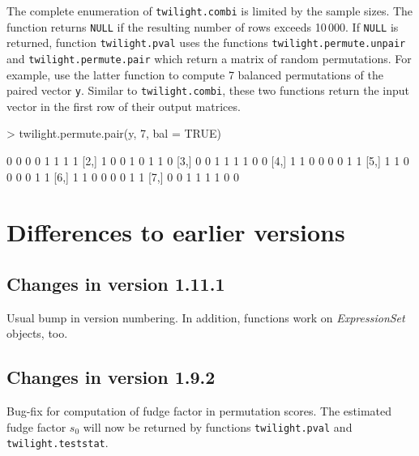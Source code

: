 \documentclass[11pt,a4paper,fleqn]{report}
\newcommand{\Rfunction}[1]{{\texttt{#1}}}
\newcommand{\Rclass}[1]{{\textit{#1}}}
\newcommand{\Rfunarg}[1]{{\texttt{#1}}}
\begin{document}
The complete enumeration of \Rfunction{twilight.combi} is limited by the sample sizes. The function returns \Rfunarg{NULL} if the resulting number of rows exceeds 10\,000. If \Rfunarg{NULL} is returned, function \Rfunction{twilight.pval} uses the functions \Rfunction{twilight.permute.unpair} and \Rfunction{twilight.permute.pair} which return a matrix of random permutations. For example, use the latter function to compute 7 balanced permutations of the paired vector \Rfunarg{y}. Similar to \Rfunction{twilight.combi}, these two functions return the input vector in the first row of their output matrices.
\begin{Schunk}
\begin{Sinput}
> twilight.permute.pair(y, 7, bal = TRUE)
\end{Sinput}
\begin{Soutput}
     [,1] [,2] [,3] [,4] [,5] [,6] [,7] [,8]
[1,]    0    0    0    0    1    1    1    1
[2,]    1    0    0    1    0    1    1    0
[3,]    0    0    1    1    1    1    0    0
[4,]    1    1    0    0    0    0    1    1
[5,]    1    1    0    0    0    0    1    1
[6,]    1    1    0    0    0    0    1    1
[7,]    0    0    1    1    1    1    0    0
\end{Soutput}
\end{Schunk}




\chapter{Differences to earlier versions}

\section*{Changes in version 1.11.1}

Usual bump in version numbering. In addition, functions work on \Rclass{ExpressionSet} objects, too.

\section*{Changes in version 1.9.2}

Bug-fix for computation of fudge factor in permutation scores. The estimated fudge factor $s_0$ will now be returned by functions \Rfunction{twilight.pval} and \Rfunction{twilight.teststat}.
\end{document}
